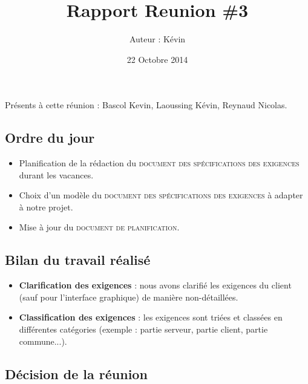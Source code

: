 \documentclass[12pt,a4paper]{article}
\title{Rapport Reunion \#3}
\author{Auteur : Kévin \bsc{LAOUSSING}}
\date{22 Octobre 2014}
\begin{document}
\maketitle

\newpage

Présents à cette réunion : Bascol Kevin, Laoussing Kévin, Reynaud Nicolas.

\subsection*{Ordre du jour}
\begin{itemize}[label = $\blacktriangleright$]
\item Planification de la rédaction du \textsc{document des spécifications des exigences} durant les vacances.
\item Choix d'un modèle du \textsc{document des spécifications des exigences} à adapter à notre projet.
\item Mise à jour du \textsc{document de planification}.\\
\end{itemize}

\subsection*{Bilan du travail réalisé}

\begin{itemize}[label = $\blacktriangleright$]
\item \textbf{Clarification des exigences} : nous avons clarifié les exigences du client (sauf pour l'interface graphique) de manière non-détaillées.

\item \textbf{Classification des exigences} : les exigences sont triées et classées en différentes catégories (exemple :  partie serveur, partie client, partie commune...).\\

\end{itemize}


\subsection*{Décision de la réunion}
\end{document}
